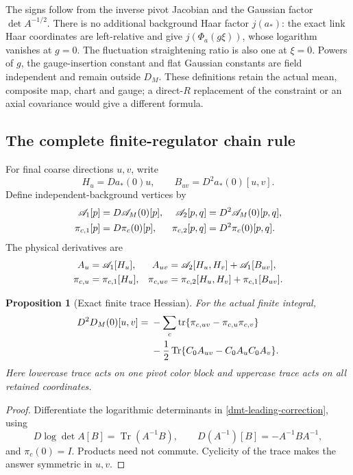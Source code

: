 \documentclass[11pt]{article}
\newtheorem{proposition}[theorem]{Proposition}
\theoremstyle{remark}
\begin{document}
The signs follow from the inverse pivot Jacobian and the
Gaussian factor \(\det A^{-1/2}\). There is no additional
background Haar factor \(j(a_*)\): the exact link Haar coordinates
are left-relative and give \(j(\Phi_a(g\xi))\), whose logarithm
vanishes at \(g=0\). The fluctuation straightening ratio is also
one at \(\xi=0\). Powers of \(g\), the gauge-insertion constant
and flat Gaussian constants are field independent and remain
outside \(D_M\). These definitions retain the actual mean,
composite map, chart and gauge; a direct-\(R\) replacement of
the constraint or an axial covariance would give a different
formula.

\subsection{The complete finite-regulator chain rule}
\label{dmt-chain-section}

For final coarse directions \(u,v\), write
\begin{equation}
 H_u=Da_*(0)u,\qquad B_{uv}=D^2a_*(0)[u,v].
 \label{dmt-stationary-responses}
\end{equation}
Define independent-background vertices by
\begin{align}
 \mathscr A_1[p]&=D\mathscr A_M(0)[p],&
 \mathscr A_2[p,q]&=D^2\mathscr A_M(0)[p,q],\notag\\
 \pi_{c,1}[p]&=D\pi_c(0)[p],&
 \pi_{c,2}[p,q]&=D^2\pi_c(0)[p,q].
 \label{dmt-background-vertices}
\end{align}
The physical derivatives are
\begin{align}
 A_u&=\mathscr A_1[H_u],&
 A_{uv}&=\mathscr A_2[H_u,H_v]+\mathscr A_1[B_{uv}],\notag\\
 \pi_{c,u}&=\pi_{c,1}[H_u],&
 \pi_{c,uv}&=\pi_{c,2}[H_u,H_v]+\pi_{c,1}[B_{uv}].
 \label{dmt-full-composition}
\end{align}

\begin{proposition}[Exact finite trace Hessian]
\label{dmt-finite-hessian}
For the actual finite integral,
\begin{align}
 D^2D_M(0)[u,v]
 ={}&-\sum_c\operatorname{tr}
       \{\pi_{c,uv}-\pi_{c,u}\pi_{c,v}\}\notag\\
 &-\frac12\operatorname{Tr}
       \{C_0A_{uv}-C_0A_uC_0A_v\}.
 \label{dmt-full-hessian}
\end{align}
Here lowercase trace acts on one pivot color block and
uppercase trace acts on all retained coordinates.
\end{proposition}
\begin{proof}
Differentiate the logarithmic determinants in
\eqref{dmt-leading-correction}, using
\[
 D\log\det A[B]=\operatorname{Tr}(A^{-1}B),
 \qquad D(A^{-1})[B]=-A^{-1}BA^{-1},
\]
and \(\pi_c(0)=I\). Products need not commute. Cyclicity of
the trace makes the answer symmetric in \(u,v\).
\end{proof}
\end{document}
